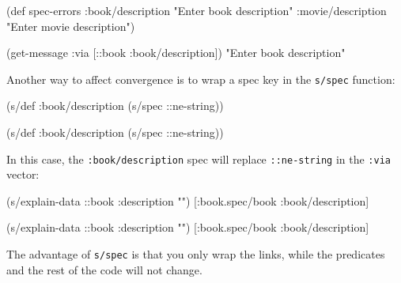 \else

  \begin{clojure}
(def spec-errors
  {:book/description "Enter book description"
   :movie/description "Enter movie description"})

(get-message {:via [::book :book/description]})
"Enter book description"
  \end{clojure}

\fi

Another way to affect convergence is to wrap a spec key in the \verb|s/spec| function:

\ifx\DEVICETYPE\MOBILE

\begin{english}
  \begin{clojure}
(s/def :book/description
  (s/spec ::ne-string))
  \end{clojure}
\end{english}

\else

\begin{english}
  \begin{clojure}
(s/def :book/description (s/spec ::ne-string))
  \end{clojure}
\end{english}

\fi

In this case, the \verb|:book/description| spec will replace \verb|::ne-string| in the \verb|:via| vector:

\ifx\DEVICETYPE\MOBILE

\begin{english}
  \begin{clojure}
(s/explain-data ::book
  {:description ""})
[:book.spec/book :book/description]
  \end{clojure}
\end{english}

\else

\begin{english}
  \begin{clojure}
(s/explain-data ::book {:description ""})
[:book.spec/book :book/description]
  \end{clojure}
\end{english}

\fi

The advantage of \verb|s/spec| is that you only wrap the links, while the predicates and the rest of the code will not change.

